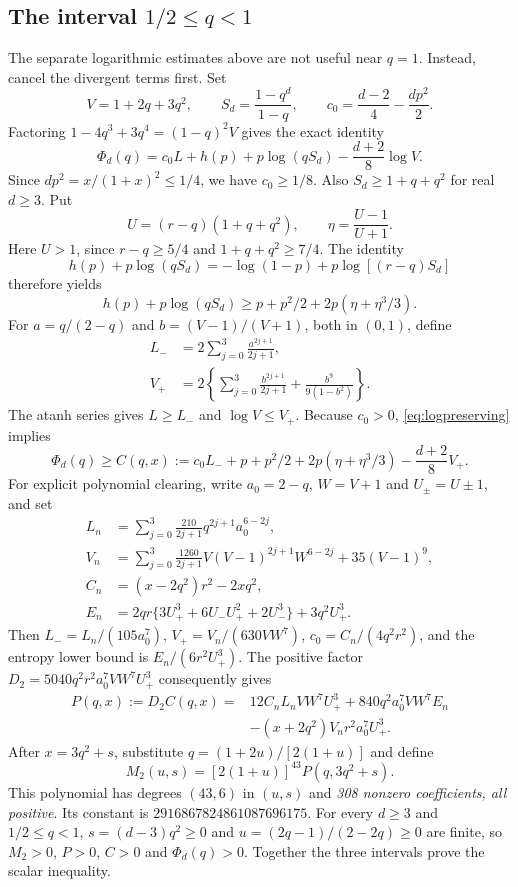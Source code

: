 \documentclass[11pt]{article}
\begin{document}
\subsection{The interval \texorpdfstring{$1/2\le q<1$}{1/2 <= q < 1}}
The separate logarithmic estimates above are not useful near $q=1$.
Instead, cancel the divergent terms first. Set
\[
 V=1+2q+3q^2,\qquad S_d=\frac{1-q^d}{1-q},\qquad
 c_0=\frac{d-2}{4}-\frac{dp^2}{2}.
\]
Factoring $1-4q^3+3q^4=(1-q)^2V$ gives the exact identity
\begin{equation}\label{eq:logpreserving}
 \Phi_d(q)=c_0L+h(p)+p\log(qS_d)-\frac{d+2}{8}\log V.
\end{equation}
Since $dp^2=x/(1+x)^2\le1/4$, we have $c_0\ge1/8$.
Also $S_d\ge1+q+q^2$ for real $d\ge3$. Put
\[
 U=(r-q)(1+q+q^2),\qquad \eta=\frac{U-1}{U+1}.
\]
Here $U>1$, since $r-q\ge5/4$ and $1+q+q^2\ge7/4$.
The identity
\[
 h(p)+p\log(qS_d)=-\log(1-p)+p\log[(r-q)S_d]
\]
therefore yields
\[
 h(p)+p\log(qS_d)\ge p+p^2/2+2p(\eta+\eta^3/3).
\]
For $a=q/(2-q)$ and $b=(V-1)/(V+1)$, both in $(0,1)$, define
\begin{align*}
 L_-&=2\sum_{j=0}^3\frac{a^{2j+1}}{2j+1},\\
 V_+&=2\left\{\sum_{j=0}^3\frac{b^{2j+1}}{2j+1}
                     +\frac{b^9}{9(1-b^2)}\right\}.
\end{align*}
The atanh series gives $L\ge L_-$ and $\log V\le V_+$.
Because $c_0>0$, \eqref{eq:logpreserving} implies
\[
 \Phi_d(q)\ge C(q,x):=
 c_0L_-+p+p^2/2+2p(\eta+\eta^3/3)-\frac{d+2}{8}V_+.
\]
For explicit polynomial clearing, write $a_0=2-q$, $W=V+1$ and
$U_\pm=U\pm1$, and set
\begin{align*}
 L_n&=\sum_{j=0}^3\frac{210}{2j+1}q^{2j+1}a_0^{6-2j},\\
 V_n&=\sum_{j=0}^3\frac{1260}{2j+1}V(V-1)^{2j+1}W^{6-2j}
                   +35(V-1)^9,\\
 C_n&=(x-2q^2)r^2-2xq^2,\\
 E_n&=2qr\{3U_+^3+6U_-U_+^2+2U_-^3\}+3q^2U_+^3.
\end{align*}
Then $L_-=L_n/(105a_0^7)$, $V_+=V_n/(630VW^7)$,
$c_0=C_n/(4q^2r^2)$, and the entropy lower bound is
$E_n/(6r^2U_+^3)$. The positive factor
$D_2=5040q^2r^2a_0^7VW^7U_+^3$ consequently gives
\begin{align*}
 P(q,x):=D_2C(q,x)={}&12C_nL_nVW^7U_+^3
       +840q^2a_0^7VW^7E_n\\
 &-(x+2q^2)V_nr^2a_0^7U_+^3.
\end{align*}
After $x=3q^2+s$, substitute $q=(1+2u)/[2(1+u)]$ and define
\[
 M_2(u,s)=[2(1+u)]^{43}P(q,3q^2+s).
\]
This polynomial has degrees $(43,6)$ in $(u,s)$ and
\emph{308 nonzero coefficients, all positive}. Its constant is
$2916867824861087696175$. For every $d\ge3$ and $1/2\le q<1$,
$s=(d-3)q^2\ge0$ and $u=(2q-1)/(2-2q)\ge0$ are finite, so
$M_2>0$, $P>0$, $C>0$ and $\Phi_d(q)>0$. Together the three
intervals prove the scalar inequality.
\end{document}
